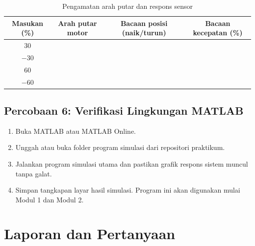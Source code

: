 \documentclass[11pt,a4paper]{article}
\begin{document}
\begin{table}[H]
	\centering
	\caption{Pengamatan arah putar dan respons sensor}
	\label{tab:p5_motor}
	\begin{tabularx}{\textwidth}{|C|C|C|C|}
		\hline
		\textbf{Masukan (\%)} & \textbf{Arah putar motor} & \textbf{Bacaan posisi (naik/turun)} & \textbf{Bacaan kecepatan (\%)} \\
		                    &                           &                                     &                                \\
		$-30$                 &                           &                                     &                                \\
		60                    &                           &                                     &                                \\
		$-60$                 &                           &                                     &                                \\
		\hline
	\end{tabularx}
\end{table}

\subsection{Percobaan 6: Verifikasi Lingkungan MATLAB}
\begin{enumerate}
	\item Buka MATLAB atau MATLAB Online.
	\item Unggah atau buka folder program simulasi dari repositori praktikum.
	\item Jalankan program simulasi utama dan pastikan grafik respons sistem muncul tanpa galat.
	\item Simpan tangkapan layar hasil simulasi. Program ini akan digunakan mulai Modul 1 dan Modul 2.
\end{enumerate}

\section{Laporan dan Pertanyaan}
\end{document}
